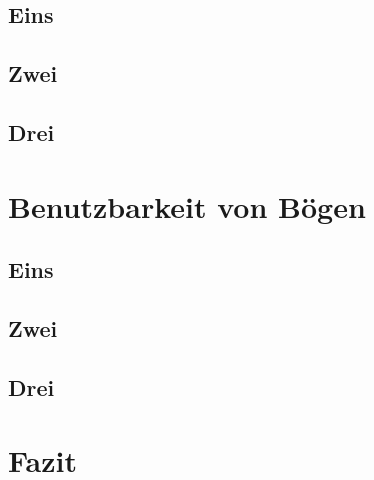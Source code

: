 \documentclass[11pt,a4paper]{report}
\begin{document}
\section{Eins}

\section{Zwei}

\section{Drei}

\chapter{Benutzbarkeit von Bögen} \label{chap:bow}

\section{Eins}

\section{Zwei}

\section{Drei}



\chapter{Fazit} \label{chap:fazit}


\newpage




\end{document}
